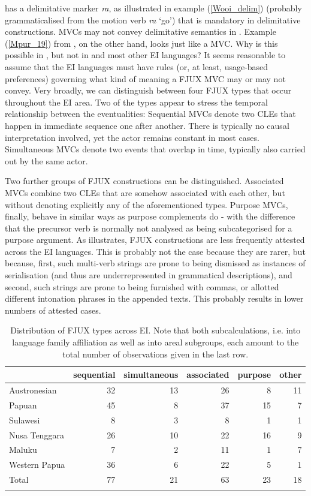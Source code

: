  has a delimitative marker \textit{ra}, as illustrated in example (\ref{Wooi_delim}) (probably grammaticalised from the motion verb \textit{ra} `go') that is mandatory in delimitative constructions. MVCs may not convey delimitative semantics in . Example (\ref{Mpur_19}) from , on the other hand, looks just like a MVC. Why is this possible in , but not in  and most other EI languages? It seems reasonable to assume that the EI languages must have rules (or, at least, usage-based preferences) governing what kind of meaning a FJUX MVC may or may not convey. Very broadly, we can distinguish between four FJUX types that occur throughout the EI area. Two of the types appear to stress the temporal relationship between the eventualities: Sequential MVCs denote two CLEs that happen in immediate sequence one after another. There is typically no causal interpretation involved, yet the actor remains constant in most cases. Simultaneous MVCs denote two events that overlap in time, typically also carried out by the same actor. 

Two further groups of FJUX constructions can be distinguished. Associated MVCs combine two CLEs that are somehow associated with each other, but without denoting explicitly any of the aforementioned types. Purpose MVCs, finally, behave in similar ways as purpose complements do - with the difference that the precursor verb is normally not analysed as being subcategorised for a purpose argument. As  illustrates, FJUX constructions are less frequently attested across the EI languages. This is probably not the case because they are rarer, but because, first, such multi-verb strings are prone to being dismissed as instances of serialisation (and thus are underrepresented in grammatical descriptions), and second, such strings are prone to being furnished with commas, or allotted different intonation phrases in the appended texts. This probably results in lower numbers of attested cases.

\begin{table}
\begin{tabular}{lrrrrr}
  \lsptoprule
 & {sequential} & {simultaneous} & {associated} & {purpose} & {other} \\  
  \midrule
  Austronesian & 32 & 13 & 26 & 8 & 11 \tabularnewline
  Papuan & 45 & 8 & 37 &  15 & 7 \tabularnewline
   \midrule
  Sulawesi & 8 & 3 & 8 & 1 & 1 \tabularnewline
  Nusa Tenggara & 26 & 10 & 22 & 16 & 9 \tabularnewline
  Maluku & 7 & 2 & 11 & 1 & 7 \tabularnewline 
  Western Papua & 36 & 6 & 22 & 5 & 1 \tabularnewline 
\lsptoprule
Total & 77 & 21 & 63 & 23 & 18 \tabularnewline
\lspbottomrule
\end{tabular}
\caption[Distribution of FJUX types across EI]{Distribution of FJUX types across EI. Note that both subcalculations, i.e. into language family affiliation as well as into areal subgroups, each amount to the total number of observations given in the last row.}
\label{table:FJUX_overview}
\end{table}

